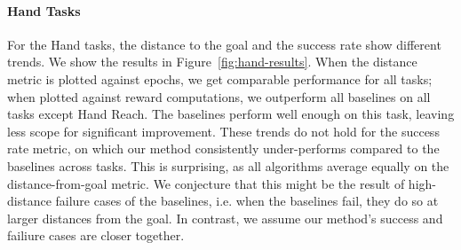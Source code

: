 \paragraph{Hand Tasks}

For the Hand tasks, the distance to the goal and the success rate show different trends.
We show the results in Figure~\ref{fig:hand-results}.
When the distance metric is plotted against epochs, we get comparable
performance for all tasks; when plotted against reward computations, we outperform
all baselines on all tasks except Hand Reach. The baselines perform
well enough on this task, leaving less scope for significant improvement.
These trends do not hold for the success rate metric, on which our method
consistently under-performs compared to the baselines across tasks. This
is surprising, as all algorithms average equally on the distance-from-goal metric.
We conjecture that this might be the result of
high-distance failure cases of the baselines, i.e. when the baselines
fail, they do so at larger distances from the goal. In contrast, we
assume our method's success and failiure cases are closer together. 

